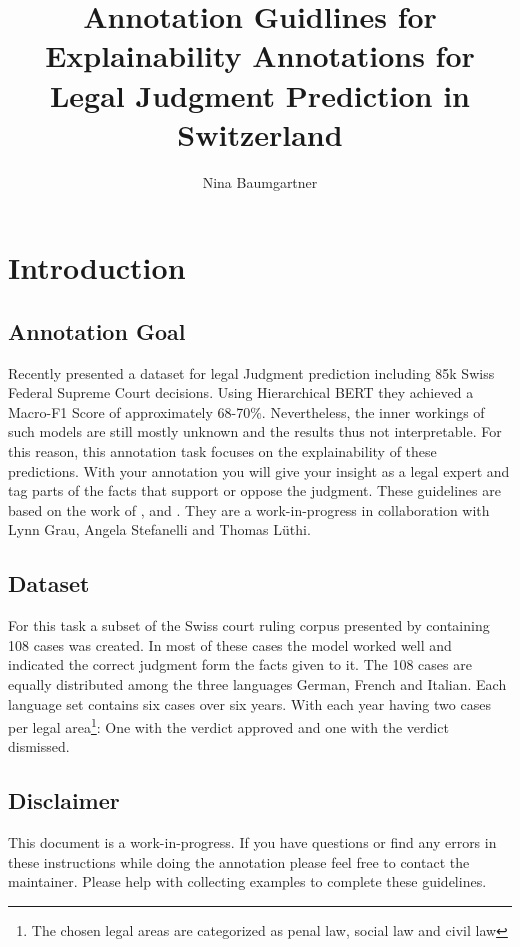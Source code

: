 \documentclass{article}
\title{Annotation Guidlines for Explainability Annotations for Legal Judgment Prediction in Switzerland}
\author{Nina Baumgartner}
\date{} %
\begin{document}
\maketitle
\section{Introduction}
\subsection{Annotation Goal}
Recently  \citet{Niklaus_2021} presented a dataset for legal Judgment prediction including 85k Swiss Federal Supreme Court decisions. Using Hierarchical BERT they achieved a Macro-F1 Score of approximately 68-70\%. Nevertheless, the inner workings of such models are still mostly unknown and the results thus not interpretable. 
For this reason, this annotation task focuses on the explainability of these predictions. With your annotation you will give your insight as a legal expert and tag parts of the facts that support or oppose the judgment. 
These guidelines are based on the work of \cite{Reiter+2020+193+202}, \cite{Leitner_2019} and \cite{pustejovsky2012natural}. They are a work-in-progress in collaboration with Lynn Grau, Angela Stefanelli and Thomas Lüthi.

\subsection{Dataset}
For this task a subset of the Swiss court ruling corpus presented by \cite{Niklaus_2021} containing 108 cases was created. In most of these cases the model worked well and indicated the correct judgment form the facts given to it. The 108 cases are equally distributed among the three languages German, French and Italian. Each language set contains six cases over six years. With each year having two cases per legal area\footnote{The chosen legal areas are categorized as penal law, social law and civil law}: One with the verdict approved and one with the verdict dismissed.

\subsection{Disclaimer}
This document is a work-in-progress. If you have questions or find any errors in these instructions while doing the annotation please feel free to contact the maintainer. Please help with collecting examples to complete these guidelines.
\end{document}
